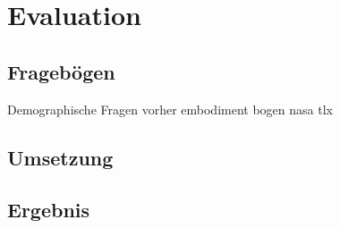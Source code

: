 \chapter{Evaluation}

\section{Fragebögen}
Demographische Fragen vorher
embodiment bogen \cite{Gonzalez-Franco2018}
nasa tlx \cite{HART1988}

\section{Umsetzung}

\section{Ergebnis}

